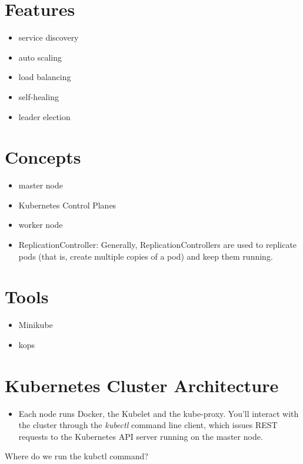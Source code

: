 \section{Features}
\begin{itemize}
	\item service discovery
	\item auto scaling
	\item load balancing
	\item self-healing
	\item leader election
\end{itemize}

\section{Concepts}

\begin{itemize}
	\item master node
	\item Kubernetes Control Planes
	\item worker node
	\item ReplicationController: Generally, ReplicationControllers are used to replicate pods (that is, create multiple copies of a pod) and keep them running.
\end{itemize}


\section{Tools}
\begin{itemize}
	\item Minikube
	\item kops
\end{itemize}

\section{Kubernetes Cluster Architecture}

\begin{itemize}
	\item Each node runs Docker, the Kubelet and the kube-proxy. You'll interact with the cluster through the \textit{kubectl} command line client, which issues REST requests to the Kubernetes API server running on the master node.
\end{itemize}


\begin{question}
Where do we run the kubctl command?
\end{question}


